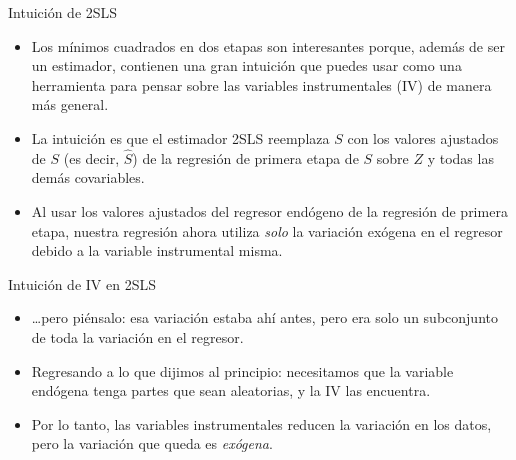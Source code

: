 \documentclass{beamer}
\begin{document}




\begin{frame}{Intuición de 2SLS}
    \begin{itemize}
        \item Los mínimos cuadrados en dos etapas son interesantes porque, además de ser un estimador, contienen una gran intuición que puedes usar como una herramienta para pensar sobre las variables instrumentales (IV) de manera más general.
        \item La intuición es que el estimador 2SLS reemplaza $S$ con los valores ajustados de $S$ (es decir, $\widehat{S}$) de la regresión de primera etapa de $S$ sobre $Z$ y todas las demás covariables.
        \item Al usar los valores ajustados del regresor endógeno de la regresión de primera etapa, nuestra regresión ahora utiliza \emph{solo} la variación exógena en el regresor debido a la variable instrumental misma.
    \end{itemize}
\end{frame}

\begin{frame}{Intuición de IV en 2SLS}
    \begin{itemize}
        \item \dots pero piénsalo: esa variación estaba ahí antes, pero era solo un subconjunto de toda la variación en el regresor.
        \item Regresando a lo que dijimos al principio: necesitamos que la variable endógena tenga partes que sean aleatorias, y la IV las encuentra.
        \item Por lo tanto, las variables instrumentales reducen la variación en los datos, pero la variación que queda es \emph{exógena}.
    \end{itemize}
\end{frame}
\end{document}
